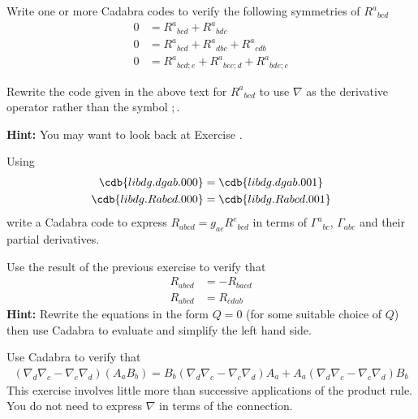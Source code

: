 \documentclass[a4paper,12pt]{article}
\numberwithin{equation}{section}%
\begin{document}
\begin{Exercises}

   \begin{Exercise}
      Write one or more Cadabra codes to verify the following symmetries of $R^{a}{}_{bcd}$
      \begin{align*}
          0 &= R^{a}{}_{bcd} + R^{a}{}_{bdc}\\
          0 &= R^{a}{}_{bcd} + R^{a}{}_{dbc} + R^{a}{}_{cdb}\\
          0 &= R^{a}{}_{bcd;e} + R^{a}{}_{bec;d} + R^{a}{}_{bde;c}
      \end{align*}
   \end{Exercise}

   \begin{Exercise}
      Rewrite the code given in the above text for $R^{a}{}_{bcd}$ to use $\nabla$ as the
      derivative operator rather than the symbol $;$.

      {\bf Hint:} You may want to look back at Exercise .
   \end{Exercise}

   \begin{Exercise}
      Using
      \begin{align*}
         \cdb{libdg.dgab.000}  &= \cdb{libdg.dgab.001}\\
         \cdb{libdg.Rabcd.000} &= \cdb{libdg.Rabcd.001}
      \end{align*}
      write a Cadabra code to express $R_{abcd} = g_{ae} R^{e}{}_{bcd}$
      in terms of $\Gamma^{a}{}_{b c}$, $\Gamma_{a b c}$ and their partial derivatives.
   \end{Exercise}

   \begin{Exercise}
      Use the result of the previous exercise to verify that
      \begin{align*}
         R_{abcd} &= - R_{bacd}\\
         R_{abcd} &=   R_{cdab}
      \end{align*}
      {\bf Hint:} Rewrite the equations in the form $Q=0$ (for some suitable choice of $Q$)
      then use Cadabra to evaluate and simplify the left hand side.
   \end{Exercise}

   \begin{Exercise}
      Use Cadabra to verify that
      \begin{align*}
         \left(\nabla_{d}\nabla_{c} - \nabla_{c}\nabla_{d}\right)\left(A_{a} B_{b}\right)
         = B_{b}\left(\nabla_{d}\nabla_{c} - \nabla_{c}\nabla_{d}\right) A_{a}
         + A_{a}\left(\nabla_{d}\nabla_{c} - \nabla_{c}\nabla_{d}\right) B_{b}
      \end{align*}
      This exercise involves little more than successive applications of the product rule.
      You do not need to express $\nabla$ in terms of the connection.


\end{Exercise}
\end{Exercises}
\end{document}
